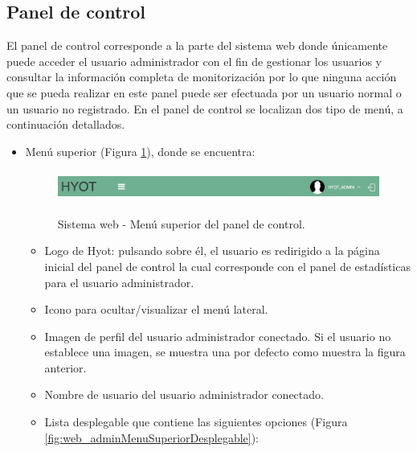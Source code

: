 \documentclass[12pt,a4paper, twoside]{report}
\begin{document}
	\subsection{Panel de control}
	
	El panel de control corresponde a la parte del sistema web donde únicamente puede acceder el usuario administrador con el fin de gestionar los usuarios y consultar la información completa de monitorización por lo que ninguna acción que se pueda realizar en este panel puede ser efectuada por un usuario normal o un usuario no registrado. En el panel de control se localizan dos tipo de menú, a continuación detallados.
	
	\begin{itemize}
		\item Menú superior (Figura \ref{fig:web_adminMenu}), donde se encuentra: 
		 
			\begin{figure}[!ht]   
				\caption{Sistema web - Menú superior del panel de control.} 
				\begin{center} 
	 				\includegraphics[width=16cm, height=1cm]{Images/userGuide/web/adminMenuSuperior} \\
					\label{fig:web_adminMenu} 
				\end{center}  	
			\end{figure}
			
			\begin{itemize}
				\item Logo de Hyot: pulsando sobre él, el usuario es redirigido a la página inicial del panel de control la cual corresponde con el panel de estadísticas para el usuario administrador.
				\item Icono para ocultar/visualizar el menú lateral.
				\item Imagen de perfil del usuario administrador conectado. Si el usuario no establece una imagen, se muestra una por defecto como muestra la figura anterior.
				\item Nombre de usuario del usuario administrador conectado.
				\item Lista desplegable que contiene las siguientes opciones (Figura \ref{fig:web_adminMenuSuperiorDesplegable}):
				

\end{itemize}
\end{itemize}
\end{document}
